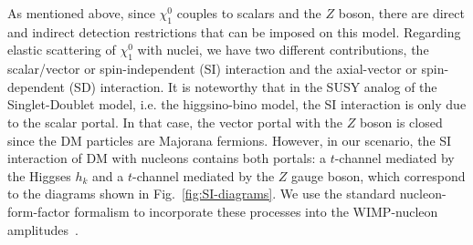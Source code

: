 \documentclass[12pt,letterpaper]{article}
\begin{document}
As mentioned above, since $\chi_1^0$ couples to scalars and the $Z$ boson, there are direct and indirect detection restrictions that can be imposed on this model. Regarding elastic scattering of $\chi_1^0$ with nuclei, we have two different contributions, the scalar/vector or spin-independent (SI) interaction and the axial-vector or spin-dependent (SD) interaction. It is noteworthy that in the SUSY analog of the Singlet-Doublet model, i.e. the higgsino-bino model, the SI interaction is only due to the scalar portal. In that case, the vector portal with the $Z$ boson is closed since the DM particles are Majorana fermions. 
However, in our scenario, the SI interaction of DM with nucleons contains both portals: a $t$-channel mediated by the Higgses $h_k$ and a $t$-channel mediated by the $Z$ gauge boson, which correspond to the diagrams shown in Fig.~\ref{fig:SI-diagrams}. We use the standard nucleon-form-factor formalism to incorporate these processes into the WIMP-nucleon amplitudes~\cite{Belanger:2008sj}. 
\end{document}
